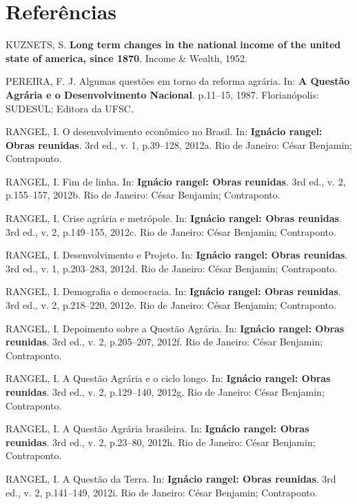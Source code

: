 \documentclass[a4paper, 12pt]{article}
\begin{document}
\hypertarget{referencias}{%
\section*{Referências}\label{referencias}}

\hypertarget{refs}{}
\leavevmode\hypertarget{ref-kuznets}{}%
KUZNETS, S. \textbf{Long term changes in the national income of the
united state of america, since 1870}. Income \& Wealth, 1952.

\leavevmode\hypertarget{ref-questaoagraria}{}%
PEREIRA, F. J. Algumas questões em torno da reforma agrária. In:
\textbf{A Questão Agrária e o Desenvolvimento Nacional}. p.11--15, 1987.
Florianópolis: SUDESUL; Editora da UFSC.

\leavevmode\hypertarget{ref-rangel1954}{}%
RANGEL, I. O desenvolvimento econômico no Brasil. In: \textbf{Ignácio
rangel: Obras reunidas}. 3rd ed., v. 1, p.39--128, 2012a. Rio de
Janeiro: César Benjamin; Contraponto.

\leavevmode\hypertarget{ref-rangel1988}{}%
RANGEL, I. Fim de linha. In: \textbf{Ignácio rangel: Obras reunidas}.
3rd ed., v. 2, p.155--157, 2012b. Rio de Janeiro: César Benjamin;
Contraponto.

\leavevmode\hypertarget{ref-rangel1986a}{}%
RANGEL, I. Crise agrária e metrópole. In: \textbf{Ignácio rangel: Obras
reunidas}. 3rd ed., v. 2, p.149--155, 2012c. Rio de Janeiro: César
Benjamin; Contraponto.

\leavevmode\hypertarget{ref-rangel1956}{}%
RANGEL, I. Desenvolvimento e Projeto. In: \textbf{Ignácio rangel: Obras
reunidas}. 3rd ed., v. 1, p.203--283, 2012d. Rio de Janeiro: César
Benjamin; Contraponto.

\leavevmode\hypertarget{ref-rangel1961}{}%
RANGEL, I. Demografia e democracia. In: \textbf{Ignácio rangel: Obras
reunidas}. 3rd ed., v. 2, p.218--220, 2012e. Rio de Janeiro: César
Benjamin; Contraponto.

\leavevmode\hypertarget{ref-rangel1960}{}%
RANGEL, I. Depoimento sobre a Questão Agrária. In: \textbf{Ignácio
rangel: Obras reunidas}. 3rd ed., v. 2, p.205--207, 2012f. Rio de
Janeiro: César Benjamin; Contraponto.

\leavevmode\hypertarget{ref-rangel1986b}{}%
RANGEL, I. A Questão Agrária e o ciclo longo. In: \textbf{Ignácio
rangel: Obras reunidas}. 3rd ed., v. 2, p.129--140, 2012g. Rio de
Janeiro: César Benjamin; Contraponto.

\leavevmode\hypertarget{ref-rangel1962}{}%
RANGEL, I. A Questão Agrária brasileira. In: \textbf{Ignácio rangel:
Obras reunidas}. 3rd ed., v. 2, p.23--80, 2012h. Rio de Janeiro: César
Benjamin; Contraponto.

\leavevmode\hypertarget{ref-rangel1986c}{}%
RANGEL, I. A Questão da Terra. In: \textbf{Ignácio rangel: Obras
reunidas}. 3rd ed., v. 2, p.141--149, 2012i. Rio de Janeiro: César
Benjamin; Contraponto.
\end{document}
